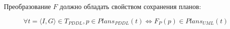\begin{enumerate}
        Преобразование $F$ должно обладать свойством сохранения планов:
        
        \begin{equation}\label{eq:plan}
            \forall t = \langle I, G\rangle \in T_{PDDL}, p \in Plans_{PDDL}(t) \Leftrightarrow F_P(p) \in Plans_{UML}(t)
        \end{equation}
    \end{enumerate}
    


 

\newpage